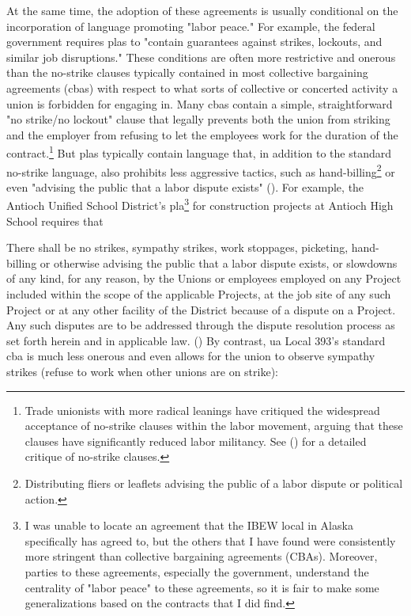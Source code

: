 \documentclass[12pt]{article}
\renewenvironment{quote}
  {\list{}{\leftmargin=\parindent\rightmargin=0pt}%
   \item\relax}
  {\endlist}
\begin{document}

At the same time, the adoption of these agreements is usually conditional on the incorporation of language promoting "labor peace." For example, the federal government requires \acrshort{pla}s to "contain guarantees against strikes, lockouts, and similar job disruptions." These conditions are often more restrictive and onerous than the no-strike clauses typically contained in most collective bargaining agreements (\acrshort{cba}s) with respect to what sorts of collective or concerted activity a union is forbidden for engaging in. Many \acrshort{cba}s contain a simple, straightforward "no strike/no lockout" clause that legally prevents both the union from striking and the employer from refusing to let the employees work for the duration of the contract.\footnote{Trade unionists with more radical leanings have critiqued the widespread acceptance of no-strike clauses within the labor movement, arguing that these clauses have significantly reduced labor militancy. See \citeauthor{burnsRevivingStrike2011} (\citeyear[Ch. 3]{burnsRevivingStrike2011}) for a detailed critique of no-strike clauses.} But \acrshort{pla}s typically contain language that, in addition to the standard no-strike language, also prohibits less aggressive tactics, such as hand-billing\footnote{Distributing fliers or leaflets advising the public of a labor dispute or political action.} or even "advising the public that a labor dispute exists" (\cite[7]{antiochunifiedschooldistrictProjectLaborAgreement2013}). For example, the Antioch Unified School District's \acrshort{pla}\footnote{I was unable to locate an agreement that the IBEW local in Alaska specifically has agreed to, but the others that I have found were consistently more stringent than collective bargaining agreements (CBAs). Moreover, parties to these agreements, especially the government, understand the centrality of "labor peace" to these agreements, so it is fair to make some generalizations based on the contracts that I did find.} for construction projects at Antioch High School requires that

\begin{quote}
There shall be no strikes, sympathy strikes, work stoppages, picketing, hand-billing or otherwise advising the public that a labor dispute exists, or slowdowns of any kind, for any reason, by the Unions or employees employed on any Project included within the scope of the applicable Projects, at the job site of any such Project or at any other facility of the District because of a dispute on a Project. Any such disputes are to be addressed through the dispute resolution process as set forth herein and in applicable law. (\cite[7]{antiochunifiedschooldistrictProjectLaborAgreement2013})
\end{quote}
By contrast, \acrshort{ua} Local 393's standard \acrshort{cba} is much less onerous and even allows for the union to observe sympathy strikes (refuse to work when other unions are on strike):
\end{document}
